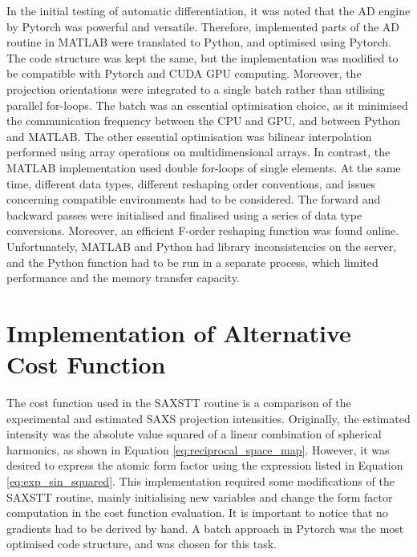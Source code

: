 In the initial testing of automatic differentiation, it was noted that the AD engine by Pytorch was powerful and versatile.
Therefore, implemented parts of the AD routine in MATLAB were translated to Python, and optimised using Pytorch.
The code structure was kept the same, but the implementation was modified to be compatible with Pytorch and CUDA GPU computing.
Moreover, the projection orientations were integrated to a single batch rather than utilising parallel for-loops. %
The batch was an essential optimisation choice, as it minimised the communication frequency between the CPU and GPU, and between Python and MATLAB.
The other essential optimisation was bilinear interpolation performed using array operations on multidimensional arrays.
In contrast, the MATLAB implementation used double for-loops of single elements.
At the same time, different data types, different reshaping order conventions, and issues concerning compatible environments had to be considered.
The forward and backward passes were initialised and finalised using a series of data type conversions.
Moreover, an efficient F-order reshaping function was found online.
Unfortunately, MATLAB and Python had library inconsistencies on the server,
and the Python function had to be run in a separate process, which limited performance and the memory transfer capacity.

\section{Implementation of Alternative Cost Function}\label{sec:alternative_cost_function}

The cost function used in the SAXSTT routine is a comparison of the experimental and estimated SAXS projection intensities.
Originally, the estimated intensity was the absolute value squared of a linear combination of spherical harmonics, as shown in Equation \eqref{eq:reciprocal_space_map}.
However, it was desired to express the atomic form factor using the expression listed in Equation \eqref{eq:exp_sin_squared}.
This implementation required some modifications of the SAXSTT routine, mainly initialising new variables and change the form factor computation in the cost function evaluation.
It is important to notice that no gradients had to be derived by hand.
A batch approach in Pytorch was the most optimised code structure, and was chosen for this task.

